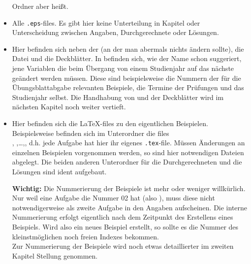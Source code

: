 \begin{itemize}
    Ordner aber  heißt.
  \item {} Alle {\tt .eps}-files. Es gibt hier keine
    Unterteilung in Kapitel oder Unterscheidung zwischen Angaben,
    Durchgerechnete oder Lösungen.
  \item {} Hier befinden sich neben der 
     (an der man abermals nichts ändern sollte), die
    Datei  und die Deckblätter. In 
    befinden sich, wie der Name schon suggeriert, jene Variablen die beim
    Übergang von einem Studienjahr auf das nächste geändert werden müssen. Diese
    sind beispielsweise die Nummern der für die Übungsblattabgabe relevanten
    Beispiele, die Termine der Prüfungen und das Studienjahr selbst. Die
    Handhabung von  und der Deckblätter wird im nächsten
    Kapitel noch weiter vertieft.
  \item {} Hier befinden sich die \LaTeX-files zu den
    eigentlichen Beispielen. Beispielsweise befinden sich im Unterordner
     die files \\,
    ,\dots,, d.h. jede Aufgabe
    hat hier ihr eigenes {\tt .tex}-file. Müssen Änderungen an einzelnen
    Beispielen vorgenommen werden, so sind hier notwendigen Dateien
    abgelegt. Die beiden anderen Unterordner für die Durchgerechneten 
    und die Lösungen sind ident aufgebaut.

    {\bf Wichtig:} Die Nummerierung der Beispiele ist mehr oder weniger
    willkürlich. Nur weil eine Aufgabe die Nummer 02 hat (also 
    ), muss diese nicht notwendigerweise als zweite
    Aufgabe in den Angaben aufscheinen. Die interne Nummerierung erfolgt 
    eigentlich nach dem Zeitpunkt des Erstellens eines Beispiels. Wird also ein
    neues Beispiel erstellt, so sollte es die Nummer des kleinstmöglichen noch
    freien Indexes bekommen.\\
    Zur Nummerierung der Beispiele wird noch etwas detaillierter im zweiten
    Kapitel Stellung genommen.
\end{itemize}

